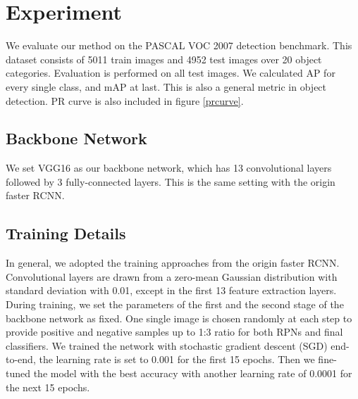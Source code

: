 \documentclass[10pt,twocolumn,letterpaper]{article}
\begin{document}
\begin{table}[ht]
\centering
{}
\caption{Average precision of different classes reported on origin faster RCNN and out ARS-Net, highlighted ones are categories with a higher mAP}
\label{Exp1}

\end{table}

\section{Experiment}
We evaluate our method on the PASCAL VOC 2007 detection benchmark. This dataset consists of 5011 train images and 4952 test images over 20 object categories. Evaluation is performed on all test images. We calculated AP for every single class, and mAP at last. This is also a general metric in object detection. PR curve is also included in figure \ref{prcurve}. 
\subsection{Backbone Network}
We set VGG16\cite{vgg} as our backbone network, which has 13 convolutional layers followed by 3 fully-connected layers. This is the same setting with the origin faster RCNN\cite{fastRCNN}.

\subsection{Training Details}
In general, we adopted the training approaches from the origin faster RCNN. Convolutional layers are drawn from a zero-mean Gaussian distribution with standard deviation with 0.01, except in the first 13 feature extraction layers\cite{fasterRCNN}. During training, we set the parameters of the first and the second stage of the backbone network as fixed. One single image is chosen randomly at each step to provide positive and negative samples up to 1:3 ratio for both RPNs and final classifiers. We trained the network with stochastic gradient descent (SGD) end-to-end, the learning rate is set to 0.001 for the first 15 epochs. Then we fine-tuned the model with the best accuracy with another learning rate of 0.0001 for the next 15 epochs.
\end{document}
